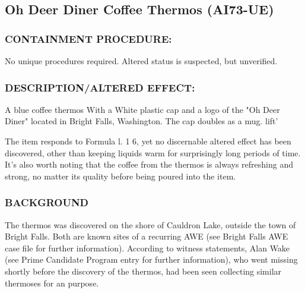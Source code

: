 \subsection*{Oh Deer Diner Coffee Thermos (AI73-UE)}
\subsubsection*{CONTAINMENT PROCEDURE:}
\par No unique procedures required. Altered
status is suspected, but unverified.
\subsubsection*{DESCRIPTION/ALTERED EFFECT:}
\par A blue coffee thermos With a White
plastic cap and a logo of the "Oh Deer
Diner" located in Bright Falls,
Washington. The cap doubles as a mug.
lift'
\par The item responds to Formula l. 1 6, yet no discernable altered
effect has been discovered, other than keeping liquids warm for
surprisingly long periods of time. It's also worth noting that the
coffee from the thermos is always refreshing and strong, no
matter its quality before being poured into the item.
\subsubsection*{BACKGROUND}
\par The thermos was discovered on the shore of Cauldron Lake,
outside the town of Bright Falls. Both are known sites of a
recurring AWE (see Bright Falls AWE case file for further
information). According to witness statements, Alan Wake (see
Prime Candidate Program entry for further information), who went
missing shortly before the discovery of the thermos, had been
seen  collecting similar thermoses for an  purpose.
